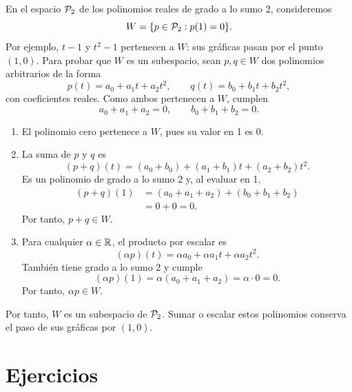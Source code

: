 \documentclass[compacto,10pt]{pubciencias-notas}
\begin{document}
\begin{ejem}\label{sem06cl01:polinomios}
    En el espacio $\mathcal{P}_2$ de los polinomios reales de grado a lo sumo 2,
    consideremos
    \[
        W=\{p\in\mathcal{P}_2:p(1)=0\}.
    \]
    Por ejemplo, $t-1$ y $t^2-1$ pertenecen a $W$:
    sus gráficas pasan por el punto $(1,0)$. Para probar que $W$ es un
    subespacio, sean $p,q\in W$ dos polinomios arbitrarios de la forma
    \[
        p(t)=a_0+a_1t+a_2t^2,\qquad
        q(t)=b_0+b_1t+b_2t^2,
    \]
    con coeficientes reales. Como ambos pertenecen a $W$, cumplen
    \[
        a_0+a_1+a_2=0,\qquad b_0+b_1+b_2=0.
    \]
    \begin{enumerate}
        \item El polinomio cero pertenece a $W$, pues su valor en 1 es 0.
        \item La suma de $p$ y $q$ es
              \[
                  (p+q)(t)=(a_0+b_0)+(a_1+b_1)t+(a_2+b_2)t^2.
              \]
              Es un polinomio de grado a lo sumo 2 y, al evaluar en 1,
              \[
                  \begin{aligned}
                      (p+q)(1)&=(a_0+a_1+a_2)+(b_0+b_1+b_2)\\
                              &=0+0=0.
                  \end{aligned}
              \]
              Por tanto, $p+q\in W$.
        \item Para cualquier $\alpha\in\mathbb{R}$, el producto por escalar es
              \[
                  (\alpha p)(t)=\alpha a_0+\alpha a_1t+\alpha a_2t^2.
              \]
              También tiene grado a lo sumo 2 y cumple
              \[
                  (\alpha p)(1)=\alpha(a_0+a_1+a_2)=\alpha\cdot0=0.
              \]
              Por tanto, $\alpha p\in W$.
    \end{enumerate}
    Por tanto, $W$ es un subespacio de $\mathcal{P}_2$. Sumar o escalar estos
    polinomios conserva el paso de sus gráficas por $(1,0)$.

\end{ejem}

\section{Ejercicios}
\end{document}
